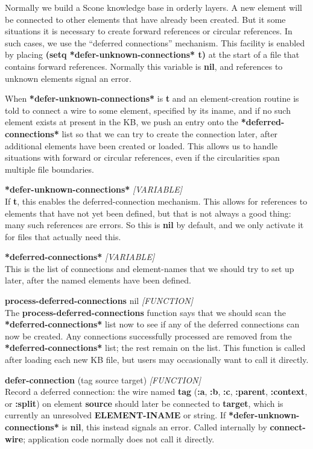 \documentclass[titlepage,twoside,openright,11pt]{article}
\begin{document}
Normally we build a Scone knowledge base in orderly layers. A new
element will be connected to other elements that have already been
created. But it some situations it is necessary to create forward
references or circular references. In such cases, we use the ``deferred
connections'' mechanism. This facility is enabled by placing
\textbf{(setq *defer-unknown-connections* t)} at the start of a file
that contains forward references. Normally this variable is
\textbf{nil}, and references to unknown elements signal an error.

When \textbf{*defer-unknown-connections*} is \textbf{t} and an
element-creation routine is told to connect a wire to some element,
specified by its iname, and if no such element exists at present in the
KB, we push an entry onto the \textbf{*deferred-connections*} list so
that we can try to create the connection later, after additional
elements have been created or loaded. This allows us to handle
situations with forward or circular references, even if the
circularities span multiple file boundaries.

\textbf{*defer-unknown-connections*} \emph{{[}VARIABLE{]}}\\
If \textbf{t}, this enables the deferred-connection mechanism. This
allows for references to elements that have not yet been defined, but
that is not always a good thing: many such references are errors. So
this is \textbf{nil} by default, and we only activate it for files that
actually need this.

\textbf{*deferred-connections*} \emph{{[}VARIABLE{]}}\\
This is the list of connections and element-names that we should try to
set up later, after the named elements have been defined.

\textbf{process-deferred-connections} nil \emph{{[}FUNCTION{]}}\\
The \textbf{process-deferred-connections} function says that we should
scan the \textbf{*deferred-connections*} list now to see if any of the
deferred connections can now be created. Any connections successfully
processed are removed from the \textbf{*deferred-connections*} list; the
rest remain on the list. This function is called after loading each new
KB file, but users may occasionally want to call it directly.

\textbf{defer-connection} (tag source target) \emph{{[}FUNCTION{]}}\\
Record a deferred connection: the wire named \textbf{tag} (\textbf{:a},
\textbf{:b}, \textbf{:c}, \textbf{:parent}, \textbf{:context}, or
\textbf{:split}) on element \textbf{source} should later be connected
to \textbf{target}, which is currently an unresolved
\textbf{ELEMENT-INAME} or string. If \textbf{*defer-unknown-connections*}
is \textbf{nil}, this instead signals an error. Called internally by
\textbf{connect-wire}; application code normally does not call it
directly.
\end{document}
